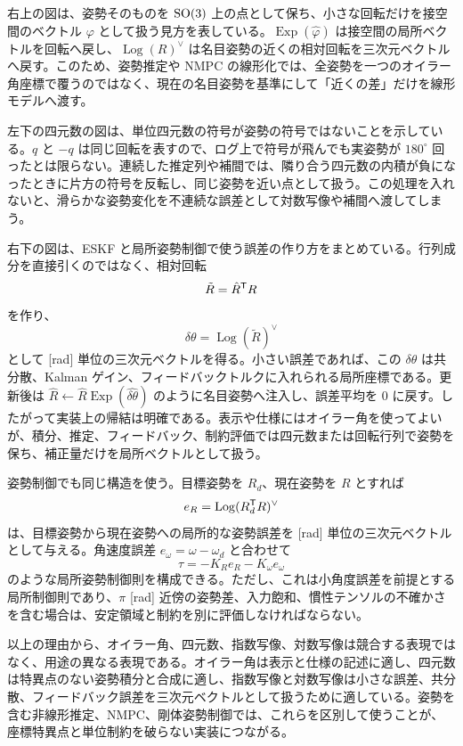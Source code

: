 右上の図は、姿勢そのものを $\operatorname{SO}(3)$ 上の点として保ち、小さな回転だけを接空間のベクトル $\varphi$ として扱う見方を表している。$\operatorname{Exp}(\widehat{\varphi})$ は接空間の局所ベクトルを回転へ戻し、$\operatorname{Log}(R)^\vee$ は名目姿勢の近くの相対回転を三次元ベクトルへ戻す。このため、姿勢推定や NMPC の線形化では、全姿勢を一つのオイラー角座標で覆うのではなく、現在の名目姿勢を基準にして「近くの差」だけを線形モデルへ渡す。

左下の四元数の図は、単位四元数の符号が姿勢の符号ではないことを示している。$q$ と $-q$ は同じ回転を表すので、ログ上で符号が飛んでも実姿勢が $180^\circ$ 回ったとは限らない。連続した推定列や補間では、隣り合う四元数の内積が負になったときに片方の符号を反転し、同じ姿勢を近い点として扱う。この処理を入れないと、滑らかな姿勢変化を不連続な誤差として対数写像や補間へ渡してしまう。

右下の図は、ESKF と局所姿勢制御で使う誤差の作り方をまとめている。行列成分を直接引くのではなく、相対回転
\begin{equation}
  \tilde{R}=\hat{R}^{\mathsf{T}} R
\end{equation}
を作り、
\begin{equation}
  \delta\theta=\operatorname{Log}(\tilde{R})^\vee
\end{equation}
として [rad] 単位の三次元ベクトルを得る。小さい誤差であれば、この $\delta\theta$ は共分散、Kalman ゲイン、フィードバックトルクに入れられる局所座標である。更新後は $\hat{R}\leftarrow\hat{R}\operatorname{Exp}(\widehat{\delta\theta})$ のように名目姿勢へ注入し、誤差平均を 0 に戻す。したがって実装上の帰結は明確である。表示や仕様にはオイラー角を使ってよいが、積分、推定、フィードバック、制約評価では四元数または回転行列で姿勢を保ち、補正量だけを局所ベクトルとして扱う。

姿勢制御でも同じ構造を使う。目標姿勢を $R_d$、現在姿勢を $R$ とすれば
\begin{equation}
  e_R=\operatorname{Log}(R_d^{\mathsf{T}} R)^\vee
\end{equation}
は、目標姿勢から現在姿勢への局所的な姿勢誤差を [rad] 単位の三次元ベクトルとして与える。角速度誤差 $e_\omega=\omega-\omega_d$ と合わせて
\begin{equation}
  \tau=-K_Re_R-K_\omega e_\omega
\end{equation}
のような局所姿勢制御則を構成できる。ただし、これは小角度誤差を前提とする局所制御則であり、$\pi$ [rad] 近傍の姿勢差、入力飽和、慣性テンソルの不確かさを含む場合は、安定領域と制約を別に評価しなければならない。

以上の理由から、オイラー角、四元数、指数写像、対数写像は競合する表現ではなく、用途の異なる表現である。オイラー角は表示と仕様の記述に適し、四元数は特異点のない姿勢積分と合成に適し、指数写像と対数写像は小さな誤差、共分散、フィードバック誤差を三次元ベクトルとして扱うために適している。姿勢を含む非線形推定、NMPC、剛体姿勢制御では、これらを区別して使うことが、座標特異点と単位制約を破らない実装につながる。
